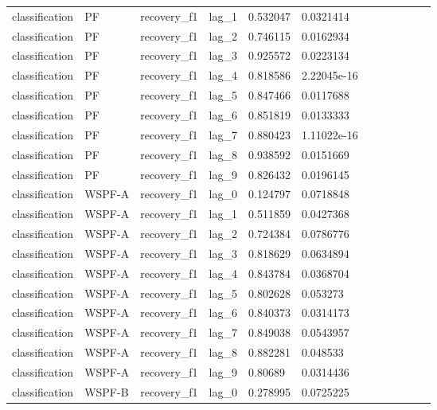 \begin{tabular}{llllllllllll}
classification & PF & recovery\_f1 & lag\_1 & 0.532047 & 0.0321414 &  &  &  &  &  &  \\
classification & PF & recovery\_f1 & lag\_2 & 0.746115 & 0.0162934 &  &  &  &  &  &  \\
classification & PF & recovery\_f1 & lag\_3 & 0.925572 & 0.0223134 &  &  &  &  &  &  \\
classification & PF & recovery\_f1 & lag\_4 & 0.818586 & 2.22045e-16 &  &  &  &  &  &  \\
classification & PF & recovery\_f1 & lag\_5 & 0.847466 & 0.0117688 &  &  &  &  &  &  \\
classification & PF & recovery\_f1 & lag\_6 & 0.851819 & 0.0133333 &  &  &  &  &  &  \\
classification & PF & recovery\_f1 & lag\_7 & 0.880423 & 1.11022e-16 &  &  &  &  &  &  \\
classification & PF & recovery\_f1 & lag\_8 & 0.938592 & 0.0151669 &  &  &  &  &  &  \\
classification & PF & recovery\_f1 & lag\_9 & 0.826432 & 0.0196145 &  &  &  &  &  &  \\
classification & WSPF-A & recovery\_f1 & lag\_0 & 0.124797 & 0.0718848 &  &  &  &  &  &  \\
classification & WSPF-A & recovery\_f1 & lag\_1 & 0.511859 & 0.0427368 &  &  &  &  &  &  \\
classification & WSPF-A & recovery\_f1 & lag\_2 & 0.724384 & 0.0786776 &  &  &  &  &  &  \\
classification & WSPF-A & recovery\_f1 & lag\_3 & 0.818629 & 0.0634894 &  &  &  &  &  &  \\
classification & WSPF-A & recovery\_f1 & lag\_4 & 0.843784 & 0.0368704 &  &  &  &  &  &  \\
classification & WSPF-A & recovery\_f1 & lag\_5 & 0.802628 & 0.053273 &  &  &  &  &  &  \\
classification & WSPF-A & recovery\_f1 & lag\_6 & 0.840373 & 0.0314173 &  &  &  &  &  &  \\
classification & WSPF-A & recovery\_f1 & lag\_7 & 0.849038 & 0.0543957 &  &  &  &  &  &  \\
classification & WSPF-A & recovery\_f1 & lag\_8 & 0.882281 & 0.048533 &  &  &  &  &  &  \\
classification & WSPF-A & recovery\_f1 & lag\_9 & 0.80689 & 0.0314436 &  &  &  &  &  &  \\
classification & WSPF-B & recovery\_f1 & lag\_0 & 0.278995 & 0.0725225 &  &  &  &  &  &  \\

\end{tabular}
